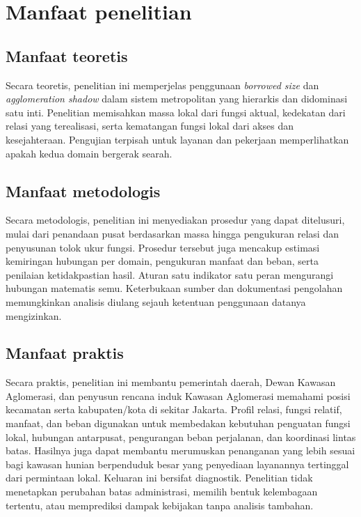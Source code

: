 \documentclass[12pt,a4paper,oneside,openany,indonesian]{report}
\begin{document}
\section{Manfaat penelitian}

\subsection{Manfaat teoretis}

Secara teoretis, penelitian ini memperjelas penggunaan \emph{borrowed size} dan \emph{agglomeration shadow} dalam sistem metropolitan yang hierarkis dan didominasi satu inti. Penelitian memisahkan massa lokal dari fungsi aktual, kedekatan dari relasi yang terealisasi, serta kematangan fungsi lokal dari akses dan kesejahteraan. Pengujian terpisah untuk layanan dan pekerjaan memperlihatkan apakah kedua domain bergerak searah.

\subsection{Manfaat metodologis}

Secara metodologis, penelitian ini menyediakan prosedur yang dapat ditelusuri, mulai dari penandaan pusat berdasarkan massa hingga pengukuran relasi dan penyusunan tolok ukur fungsi. Prosedur tersebut juga mencakup estimasi kemiringan hubungan per domain, pengukuran manfaat dan beban, serta penilaian ketidakpastian hasil. Aturan satu indikator satu peran mengurangi hubungan matematis semu. Keterbukaan sumber dan dokumentasi pengolahan memungkinkan analisis diulang sejauh ketentuan penggunaan datanya mengizinkan.

\subsection{Manfaat praktis}

Secara praktis, penelitian ini membantu pemerintah daerah, Dewan Kawasan Aglomerasi, dan penyusun rencana induk Kawasan Aglomerasi memahami posisi kecamatan serta kabupaten/kota di sekitar Jakarta. Profil relasi, fungsi relatif, manfaat, dan beban digunakan untuk membedakan kebutuhan penguatan fungsi lokal, hubungan antarpusat, pengurangan beban perjalanan, dan koordinasi lintas batas. Hasilnya juga dapat membantu merumuskan penanganan yang lebih sesuai bagi kawasan hunian berpenduduk besar yang penyediaan layanannya tertinggal dari permintaan lokal. Keluaran ini bersifat diagnostik. Penelitian tidak menetapkan perubahan batas administrasi, memilih bentuk kelembagaan tertentu, atau memprediksi dampak kebijakan tanpa analisis tambahan.
\end{document}
